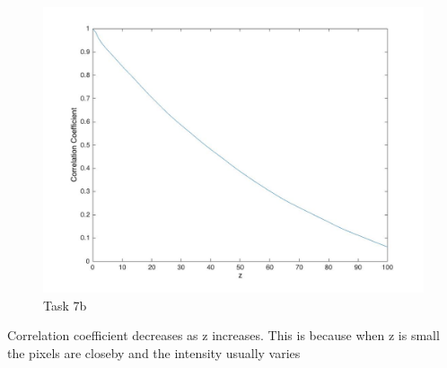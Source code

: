\documentclass[11pt]{article}
\begin{document}
\begin{figure}[h]
  \includegraphics[width=\linewidth]{graph2.jpg}
  \caption{Task 7b}
  \label{fig:task7b}
\end{figure}

Correlation coefficient decreases as z increases. This is because when z is small the pixels are closeby and the intensity usually varies

\pagebreak
\end{document}
